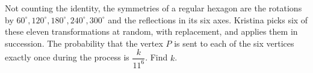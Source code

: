 Not counting the identity, the symmetries of a regular hexagon are the rotations by $60^\circ,120^\circ,180^\circ,240^\circ,300^\circ$ and the reflections in its six axes. Kristina picks six of these eleven transformations at random, with replacement, and applies them in succession. The probability that the vertex $P$ is sent to each of the six vertices exactly once during the process is $\dfrac k{11^6}$. Find $k$.
